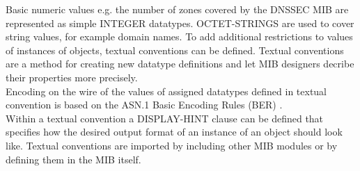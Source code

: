 Basic numeric values e.g. the number of zones covered by the DNSSEC MIB are represented as simple INTEGER datatypes. OCTET-STRINGS are used to cover string values, for example domain names. To add additional restrictions to values of instances of objects, textual conventions can be defined. Textual conventions are a method for creating new datatype definitions and let MIB designers decribe their properties more precisely. 
\\
Encoding on the wire of the values of assigned  datatypes  defined in textual convention is based on the ASN.1 Basic Encoding Rules (BER) \cite{ber-asn1}  \cite{snmp-wire}.
\\
Within a textual convention a DISPLAY-HINT clause can be defined that specifies how the desired output format of an instance of an object should look like. Textual conventions are imported by including other MIB modules \cite{smi-tc} or by defining them in the MIB itself. 

